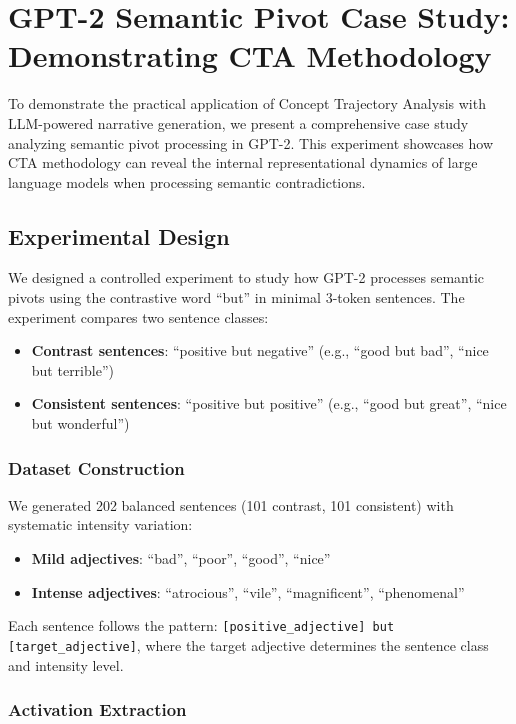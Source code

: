 \section{GPT-2 Semantic Pivot Case Study: Demonstrating CTA Methodology}

To demonstrate the practical application of Concept Trajectory Analysis with LLM-powered narrative generation, we present a comprehensive case study analyzing semantic pivot processing in GPT-2. This experiment showcases how CTA methodology can reveal the internal representational dynamics of large language models when processing semantic contradictions.

\subsection{Experimental Design}

We designed a controlled experiment to study how GPT-2 processes semantic pivots using the contrastive word ``but'' in minimal 3-token sentences. The experiment compares two sentence classes:

\begin{itemize}
    \item \textbf{Contrast sentences}: ``positive but negative'' (e.g., ``good but bad'', ``nice but terrible'')
    \item \textbf{Consistent sentences}: ``positive but positive'' (e.g., ``good but great'', ``nice but wonderful'')
\end{itemize}

\subsubsection{Dataset Construction}

We generated 202 balanced sentences (101 contrast, 101 consistent) with systematic intensity variation:

\begin{itemize}
    \item \textbf{Mild adjectives}: ``bad'', ``poor'', ``good'', ``nice''
    \item \textbf{Intense adjectives}: ``atrocious'', ``vile'', ``magnificent'', ``phenomenal''
\end{itemize}

Each sentence follows the pattern: \texttt{[positive\_adjective] but [target\_adjective]}, where the target adjective determines the sentence class and intensity level.

\subsubsection{Activation Extraction}

